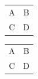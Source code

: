 \documentclass{article}
\begin{document}
\begin{center}
\begin{tabular}{cc}
\hline
A & B\\
C & D\\
\hline
\end{tabular}
\end{center}

\begin{center}
\begin{tabular*}{.5\textwidth}{@{\extracolsep{\fill}}cc@{}}
\hline
A & B\\
C & D\\
\hline
\end{tabular*}
\end{center}
\end{document}
